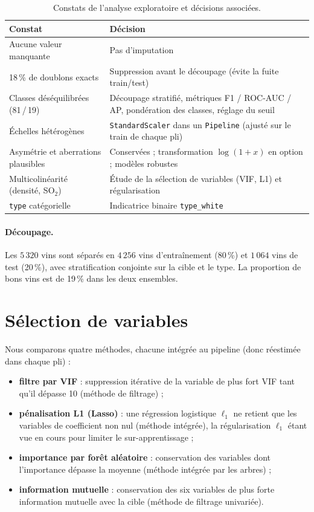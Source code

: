 \documentclass[11pt,a4paper]{article}
\begin{document}
\begin{table}[htbp]
\centering\small
\caption{Constats de l'analyse exploratoire et décisions associées.}
\begin{tabular}{@{}p{5.2cm}p{9.5cm}@{}}
\toprule
Constat & Décision \\
\midrule
Aucune valeur manquante & Pas d'imputation \\
18\,\% de doublons exacts & Suppression avant le découpage (évite la fuite train/test) \\
Classes déséquilibrées (81\,/\,19) & Découpage stratifié, métriques F1 / ROC-AUC / AP, pondération des classes, réglage du seuil \\
Échelles hétérogènes & \texttt{StandardScaler} dans un \texttt{Pipeline} (ajusté sur le train de chaque pli) \\
Asymétrie et aberrations plausibles & Conservées ; transformation $\log(1+x)$ en option ; modèles robustes \\
Multicolinéarité (densité, SO$_2$) & Étude de la sélection de variables (VIF, L1) et régularisation \\
\texttt{type} catégorielle & Indicatrice binaire \texttt{type\_white} \\
\bottomrule
\end{tabular}
\end{table}

\paragraph{Découpage.}
Les $5\,320$ vins sont séparés en $4\,256$ vins d'entraînement (80\,\%) et $1\,064$ vins de test (20\,\%), avec stratification conjointe sur la cible et le type.
La proportion de bons vins est de 19\,\% dans les deux ensembles.

\section{Sélection de variables}\label{sec:selection}

Nous comparons quatre méthodes, chacune intégrée au pipeline (donc réestimée dans chaque pli) :
\begin{itemize}
  \item \textbf{filtre par VIF} : suppression itérative de la variable de plus fort VIF tant qu'il dépasse 10 (méthode de filtrage) ;
  \item \textbf{pénalisation L1 (Lasso)} : une régression logistique $\ell_1$ ne retient que les variables de coefficient non nul (méthode intégrée), la régularisation
        $\ell_1$ étant vue en cours pour limiter le sur-apprentissage ;
  \item \textbf{importance par forêt aléatoire} : conservation des variables dont l'importance dépasse la moyenne (méthode intégrée par les arbres) ;
  \item \textbf{information mutuelle} : conservation des six variables de plus forte information mutuelle avec la cible (méthode de filtrage univariée).
\end{itemize}
\end{document}
